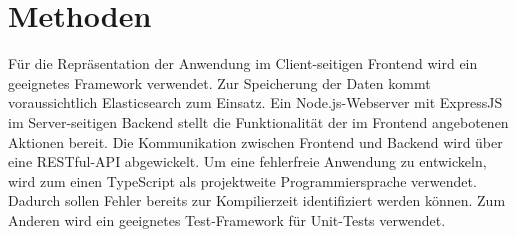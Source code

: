 \documentclass[a4paper, 10pt, conference]{ieeeconf}
\begin{document}
\section{Methoden} \label{s:methoden}
Für die Repräsentation der Anwendung im Client-seitigen Frontend wird ein geeignetes Framework verwendet.  Zur Speicherung der Daten kommt voraussichtlich Elasticsearch zum Einsatz. Ein Node.js-Webserver mit ExpressJS im Server-seitigen Backend stellt die Funktionalität der im Frontend angebotenen Aktionen bereit.  Die Kommunikation zwischen Frontend und Backend wird über eine RESTful-API abgewickelt. Um eine fehlerfreie Anwendung zu entwickeln, wird zum einen TypeScript als projektweite Programmiersprache verwendet. Dadurch sollen Fehler bereits zur Kompilierzeit identifiziert werden können. Zum Anderen wird ein geeignetes Test-Framework für Unit-Tests verwendet.

\printbibliography
\end{document}
